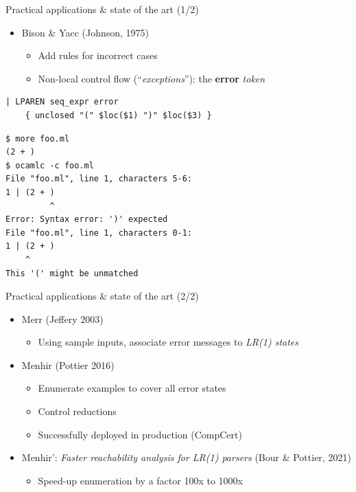 \documentclass{beamer}          %
\begin{document}
\begin{frame}[fragile]{Practical applications \& state of the art (1/2)}
  \begin{itemize}
    \item Bison \& Yacc (Johnson, 1975)
      \begin{itemize}
      \item Add rules for incorrect cases
      \item Non-local control flow (``{\em exceptions}''): the \textbf{error} {\em token}
    \end{itemize}
  \end{itemize}
\pause
\small
\begin{verbatim}
| LPAREN seq_expr error
    { unclosed "(" $loc($1) ")" $loc($3) }
\end{verbatim}
\pause
\begin{verbatim}
$ more foo.ml
(2 + )
$ ocamlc -c foo.ml
File "foo.ml", line 1, characters 5-6:
1 | (2 + )
         ^
Error: Syntax error: ')' expected
File "foo.ml", line 1, characters 0-1:
1 | (2 + )
    ^
This '(' might be unmatched
\end{verbatim}
\end{frame}

\begin{frame}[fragile]{Practical applications \& state of the art (2/2)}
  \begin{itemize}
    \item Merr (Jeffery 2003)
      \begin{itemize}
        \item Using sample inputs, associate error messages to {\em LR(1) states}
      \end{itemize}
    \pause
    \item Menhir (Pottier 2016)
      \begin{itemize}
        \item Enumerate examples to cover all error states
        \item Control reductions 
        \item Successfully deployed in production (CompCert)
      \end{itemize}
    \pause
    \pause
    \item Menhir': {\em Faster reachability analysis for LR(1) parsers} (Bour \& Pottier, 2021)
      \begin{itemize}
        \item Speed-up enumeration by a factor 100x to 1000x
      \end{itemize}
  \end{itemize}
\end{frame}
\end{document}
